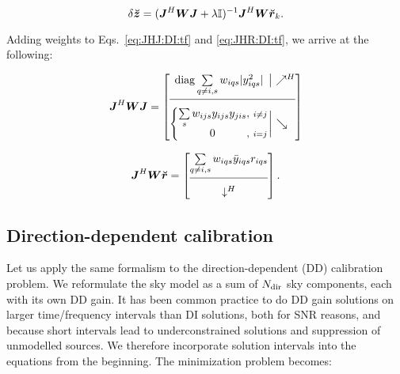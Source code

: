 \documentclass[useAMS,usenatbib]{mn2e}
\makeatletter
\newcommand{\II}{\mathbb{I}}
\newcommand{\mat}[1]{{\bmath{#1}}}
\newcommand{\JJ}{\mat{J}} %
\newcommand{\MM}{\mat{M}}
\newcommand{\GG}{\mat{G}}
\newcommand{\Matrix}[2]{\left [ \begin{array}{@{}#1@{}}#2\end{array} \right ]}
\newcommand{\Stack}[1]{\begin{array}{@{}c@{}}#1\end{array}}
\newcommand{\AUG}[1]{\bmath{\breve{#1}}}
\newcommand{\Zz}{\AUG{z}}
\newcommand{\Rr}{\AUG{r}}
\makeatother
\begin{document}
\begin{equation}
\label{eq:LM:W}
\delta\Zz = (\JJ^H \mat{W} \JJ + \lambda\II)^{-1}\JJ^H \mat{W} \Rr_k.
\end{equation}

Adding weights to Eqs.~\ref{eq:JHJ:DI:tf} and \ref{eq:JHR:DI:tf}, we arrive at the following:


\begin{equation}
\label{eq:JHJ:DI:tfw}
\JJ^H\mat{W}\JJ = 
\JHJblocks{
  \mathrm{diag} \sum\limits_{q\ne i,s} w_{iqs} |y^2_{iqs}|
}{
  \left \{ 
  \begin{array}{@{}c@{,~}c@{}}
   \sum\limits_{s} w_{ijs} y_{ijs}y_{jis}&{\scriptstyle i\ne j} \\
   0 &{\scriptstyle i=j}
  \end{array} \right . 
}
\end{equation}

\begin{equation}
\label{eq:JHR:DI:tfw}
\JJ^H\mat{W}\Rr 
= \Matrix{c}{
\sum\limits_{q\ne i,s} w_{iqs} \bar{y}_{iqs} r_{iqs}   \\
\hline\\[-8pt]
\downarrow^H
}.
\end{equation}


\subsection{Direction-dependent calibration}
\label{sec:unpol:DD}

Let us apply the same formalism to the direction-dependent (DD) calibration problem. 
We reformulate the sky model as a sum of $N_\mathrm{dir}$ sky components, each with its own DD 
gain. It has been common practice to do DD gain solutions on larger time/frequency intervals than DI 
solutions, both for SNR reasons, and because short intervals lead to underconstrained solutions
and suppression of unmodelled sources. We therefore incorporate solution intervals into the
equations from the beginning. The minimization problem becomes:

\newcommand{\GGd}{\GG^{(d)}}
\newcommand{\GGdH}{\GG^{(d)H}}
\newcommand{\MMd}{\MM^{(d)}}
\newcommand{\YYd}{\YY^{(d)}}
\newcommand{\YYdH}{\YY^{(d)H}}
\newcommand{\YYc}{\YY^{(c)}}
\newcommand{\YYcH}{\YY^{(c)H}}
\newcommand{\ggd}{g^{(d)}}
\newcommand{\ggdH}{\bar{g}^{(d)}}
\newcommand{\ggc}{g^{(c)}}
\newcommand{\ggcH}{\bar{g}^{(c)}}
\newcommand{\mmc}{m^{(c)}}
\newcommand{\mmd}{m^{(d)}}
\newcommand{\mmcH}{\bar{m}^{(c)}}
\newcommand{\mmdH}{\bar{m}^{(d)}}
\newcommand{\yyd}{y^{(d)}}
\newcommand{\yydH}{\bar{y}^{(d)}}
\newcommand{\yyc}{y^{(c)}}
\newcommand{\yycH}{\bar{y}^{(c)}}
\end{document}

